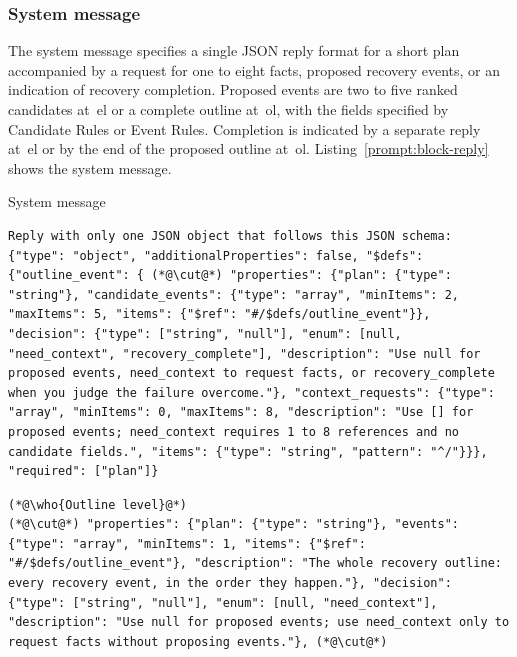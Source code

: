 \subsubsection{System message}\label{sec:block-reply}

The system message specifies a single JSON reply format for a short plan accompanied by a
request for one to eight facts, proposed recovery events, or an indication of recovery completion.
Proposed events are two to five ranked candidates at~\gls{el} or a complete outline at~\gls{ol},
with the fields specified by Candidate Rules or Event Rules. Completion is indicated by a separate
reply at~\gls{el} or by the end of the proposed outline at~\gls{ol}.
Listing~\ref{prompt:block-reply} shows the system message.

\begin{recbox}{System message}
\begin{lstlisting}
Reply with only one JSON object that follows this JSON schema:
{"type": "object", "additionalProperties": false, "$defs": {"outline_event": { (*@\cut@*) "properties": {"plan": {"type": "string"}, "candidate_events": {"type": "array", "minItems": 2, "maxItems": 5, "items": {"$ref": "#/$defs/outline_event"}}, "decision": {"type": ["string", "null"], "enum": [null, "need_context", "recovery_complete"], "description": "Use null for proposed events, need_context to request facts, or recovery_complete when you judge the failure overcome."}, "context_requests": {"type": "array", "minItems": 0, "maxItems": 8, "description": "Use [] for proposed events; need_context requires 1 to 8 references and no candidate fields.", "items": {"type": "string", "pattern": "^/"}}}, "required": ["plan"]}
\end{lstlisting}

\vspace{3pt}
\begin{lstlisting}
(*@\who{Outline level}@*)
(*@\cut@*) "properties": {"plan": {"type": "string"}, "events": {"type": "array", "minItems": 1, "items": {"$ref": "#/$defs/outline_event"}, "description": "The whole recovery outline: every recovery event, in the order they happen."}, "decision": {"type": ["string", "null"], "enum": [null, "need_context"], "description": "Use null for proposed events; use need_context only to request facts without proposing events."}, (*@\cut@*)
\end{lstlisting}
\end{recbox}

